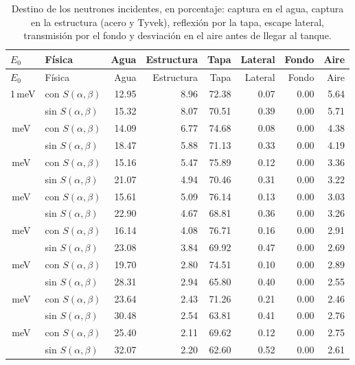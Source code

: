 \begin{longtable}{llrrrrrr}
\caption{Destino de los neutrones incidentes, en porcentaje: captura en el agua, captura en la estructura (acero y Tyvek), reflexión por la tapa, escape lateral, transmisión por el fondo y desviación en el aire antes de llegar al tanque.}\\
\toprule
$E_0$ & Física & Agua & Estructura & Tapa & Lateral & Fondo & Aire \\
\midrule
\endfirsthead
\toprule
$E_0$ & Física & Agua & Estructura & Tapa & Lateral & Fondo & Aire \\
\midrule
\endhead
1\,meV & con $S(\alpha,\beta)$ & 12.95 & 8.96 & 72.38 & 0.07 & 0.00 & 5.64 \\
 & sin $S(\alpha,\beta)$ & 15.32 & 8.07 & 70.51 & 0.39 & 0.00 & 5.71 \\
\addlinespace[2pt]
2.5\,meV & con $S(\alpha,\beta)$ & 14.09 & 6.77 & 74.68 & 0.08 & 0.00 & 4.38 \\
 & sin $S(\alpha,\beta)$ & 18.47 & 5.88 & 71.13 & 0.33 & 0.00 & 4.19 \\
\addlinespace[2pt]
5\,meV & con $S(\alpha,\beta)$ & 15.16 & 5.47 & 75.89 & 0.12 & 0.00 & 3.36 \\
 & sin $S(\alpha,\beta)$ & 21.07 & 4.94 & 70.46 & 0.31 & 0.00 & 3.22 \\
\addlinespace[2pt]
7\,meV & con $S(\alpha,\beta)$ & 15.61 & 5.09 & 76.14 & 0.13 & 0.00 & 3.03 \\
 & sin $S(\alpha,\beta)$ & 22.90 & 4.67 & 68.81 & 0.36 & 0.00 & 3.26 \\
\addlinespace[2pt]
10\,meV & con $S(\alpha,\beta)$ & 16.14 & 4.08 & 76.71 & 0.16 & 0.00 & 2.91 \\
 & sin $S(\alpha,\beta)$ & 23.08 & 3.84 & 69.92 & 0.47 & 0.00 & 2.69 \\
\addlinespace[2pt]
25\,meV & con $S(\alpha,\beta)$ & 19.70 & 2.80 & 74.51 & 0.10 & 0.00 & 2.89 \\
 & sin $S(\alpha,\beta)$ & 28.31 & 2.94 & 65.80 & 0.40 & 0.00 & 2.55 \\
\addlinespace[2pt]
50\,meV & con $S(\alpha,\beta)$ & 23.64 & 2.43 & 71.26 & 0.21 & 0.00 & 2.46 \\
 & sin $S(\alpha,\beta)$ & 30.48 & 2.54 & 63.81 & 0.41 & 0.00 & 2.76 \\
\addlinespace[2pt]
80\,meV & con $S(\alpha,\beta)$ & 25.40 & 2.11 & 69.62 & 0.12 & 0.00 & 2.75 \\
 & sin $S(\alpha,\beta)$ & 32.07 & 2.20 & 62.60 & 0.52 & 0.00 & 2.61 \\

\end{longtable}
